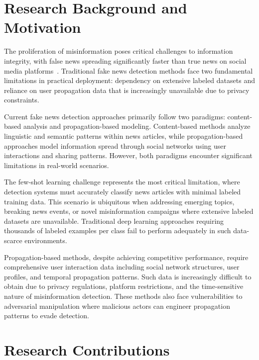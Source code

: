 
\section{Research Background and Motivation}

The proliferation of misinformation poses critical challenges to information integrity, with false news spreading significantly faster than true news on social media platforms~\cite{vosoughi2018spread}. Traditional fake news detection methods face two fundamental limitations in practical deployment: dependency on extensive labeled datasets and reliance on user propagation data that is increasingly unavailable due to privacy constraints.

Current fake news detection approaches primarily follow two paradigms: content-based analysis and propagation-based modeling. Content-based methods analyze linguistic and semantic patterns within news articles, while propagation-based approaches model information spread through social networks using user interactions and sharing patterns. However, both paradigms encounter significant limitations in real-world scenarios.

The few-shot learning challenge represents the most critical limitation, where detection systems must accurately classify news articles with minimal labeled training data. This scenario is ubiquitous when addressing emerging topics, breaking news events, or novel misinformation campaigns where extensive labeled datasets are unavailable. Traditional deep learning approaches requiring thousands of labeled examples per class fail to perform adequately in such data-scarce environments.

Propagation-based methods, despite achieving competitive performance, require comprehensive user interaction data including social network structures, user profiles, and temporal propagation patterns. Such data is increasingly difficult to obtain due to privacy regulations, platform restrictions, and the time-sensitive nature of misinformation detection. These methods also face vulnerabilities to adversarial manipulation where malicious actors can engineer propagation patterns to evade detection.

\section{Research Contributions}

